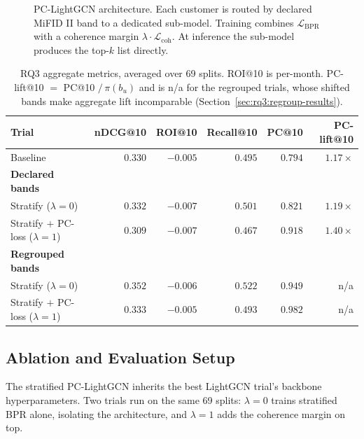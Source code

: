 \begin{figure}[!t]
{%
}
\caption{PC-LightGCN architecture. Each customer is routed by declared MiFID II band to a dedicated sub-model. Training combines $\mathcal{L}_{\text{BPR}}$ with a coherence margin $\lambda \cdot \mathcal{L}_{\text{coh}}$. At inference the sub-model produces the top-$k$ list directly.}
\label{fig:architecture}
\end{figure}

\begin{table}[!t]
\centering
\small
\begin{tabular}{lrrrrr}
\toprule
Trial & nDCG@10 & ROI@10 & Recall@10 & PC@10 & PC-lift@10 \\
\midrule
Baseline & $0.330$ & $-0.005$ & $0.495$ & $0.794$ & $1.17\times$ \\
\midrule
\textbf{Declared bands} & & & & & \\
\quad Stratify ($\lambda{=}0$) & $0.332$ & $-0.007$ & $0.501$ & $0.821$ & $1.19\times$ \\
\quad Stratify $+$ PC-loss ($\lambda{=}1$) & $0.309$ & $-0.007$ & $0.467$ & $0.918$ & $1.40\times$ \\
\midrule
\textbf{Regrouped bands} & & & & & \\
\quad Stratify ($\lambda{=}0$) & $0.352$ & $-0.006$ & $0.522$ & $0.949$ & n/a \\
\quad Stratify $+$ PC-loss ($\lambda{=}1$) & $0.333$ & $-0.005$ & $0.493$ & $0.982$ & n/a \\
\bottomrule
\end{tabular}
\caption{RQ3 aggregate metrics, averaged over 69 splits. ROI@10 is per-month. PC-lift@10 $=$ PC@10 $/\,\pi(b_u)$ and is n/a for the regrouped trials, whose shifted bands make aggregate lift incomparable (Section~\ref{sec:rq3:regroup-results}).}
\label{tab:pclgcn-aggregate}
\end{table}

\subsection{Ablation and Evaluation Setup}
\label{sec:rq3:setup}
The stratified PC-LightGCN inherits the best LightGCN trial's backbone hyperparameters. Two trials run on the same 69 splits: $\lambda = 0$ trains stratified BPR alone, isolating the architecture, and $\lambda = 1$ adds the coherence margin on top.

